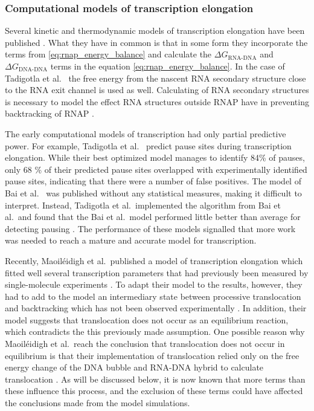 \subsubsection{Computational models of transcription elongation}
Several kinetic and thermodynamic models of transcription elongation have been
published \cite{tadigotla_thermodynamic_2006, bai_sequence-dependent_2004,
guajardo_model_1997, yager_thermodynamic_1991}. What they have in common is
that in some form they incorporate the terms from
\eqref{eq:rnap_energy_balance} and calculate the $\Delta G_{\text{RNA-DNA}}$
and $\Delta G_{\text{DNA-DNA}}$ terms in the equation
\eqref{eq:rnap_energy_balance}. In the case of Tadigotla et al.\
\cite{tadigotla_thermodynamic_2006} the free energy from the nascent RNA
secondary structure close to the RNA exit channel is used as well. Calculating
of RNA secondary structures is necessary to model the effect RNA structures
outside RNAP have in preventing backtracking of RNAP \cite{zamft_nascent_2012}.

The early computational models of transcription had only partial predictive
power. For example, Tadigotla et al.\ \cite{tadigotla_thermodynamic_2006}
predict pause sites during transcription elongation. While their best optimized
model manages to identify 84\% of pauses, only 68 \% of their predicted pause
sites overlapped with experimentally identified pause sites, indicating that
there were a number of false positives. The model of Bai et al.\
\cite{bai_mechanochemical_2007} was published without any statistical measures,
making it difficult to interpret. Instead, Tadigotla et al.\ implemented the
algorithm from Bai et al.\ and found that the Bai et al.\ model performed
little better than average for detecting pausing
\cite{tadigotla_thermodynamic_2006}. The performance of these models signalled
that more work was needed to reach a mature and accurate model for
transcription.

Recently, Maoiléidigh et al.\ published a model of transcription elongation
which fitted well several transcription parameters that had previously been
measured by single-molecule experiments \cite{o_maoileidigh_unified_2011}. To
adapt their model to the results, however, they had to add to the model an
intermediary state between processive translocation and backtracking which has
not been observed experimentally \cite{o_maoileidigh_unified_2011}. In
addition, their model suggests that translocation does not occur as an
equilibrium reaction, which contradicts the this previously made assumption.
One possible reason why Maoiléidigh et al.\ reach the conclusion that
translocation does not occur in equilibrium is that their implementation of
translocation relied only on the free energy change of the DNA bubble and
RNA-DNA hybrid to calculate translocation \cite{o_maoileidigh_unified_2011}.
As will be discussed below, it is now known that more terms than these
influence this process, and the exclusion of these terms could have affected
the conclusions made from the model simulations.

